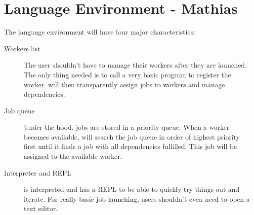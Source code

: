 \section{Language Environment - Mathias}
\label{sect:tech}
The language environment will have four major characteristics:
\begin{description}
\item[Workers list] The user shouldn't have to manage their workers after
they are launched. The only thing needed is to call a very basic program
to register the worker. \lang{} will then transparently assign jobs to workers
and manage dependencies.
\item[Job queue] Under the hood, jobs are stored in a priority queue. When a
worker becomes available, \lang{} will search the job queue in order of highest
priority first until it finds a job with all dependencies fulfilled. This job
will be assigned to the available worker.
\item[Interpreter and REPL] \lang{} is interpreted and has a REPL to be able to
quickly try things out and iterate. For really basic job launching, users shouldn't
even need to open a text editor.
\end{description}
